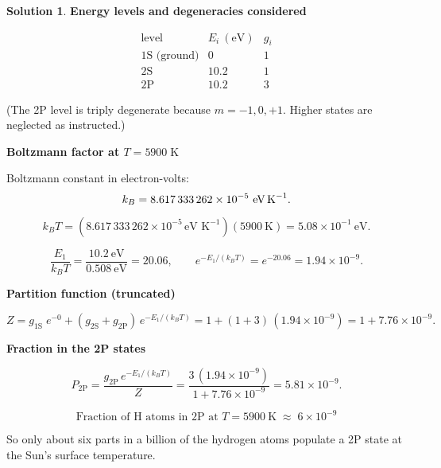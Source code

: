 \documentclass[12pt]{article}
\theoremstyle{definition} %
\newtheorem{solution}{Solution}
\theoremstyle{plain} %
\begin{document}
            \begin{solution}
              \textbf{Energy levels and degeneracies considered}
              
              \[
              \begin{array}{c|c|c}
              \text{level} & E_i\ (\text{eV}) & g_i \\ \hline
              \text{1S (ground)} & 0      & 1 \\
              \text{2S}          & 10.2   & 1 \\
              \text{2P}          & 10.2   & 3   %
              \end{array}
              \]
              
              (The 2P level is triply degenerate because \(m=-1,0,+1\).  
              Higher states are neglected as instructed.)
              
              \medskip
              \textbf{Boltzmann factor at \(T = 5900\;\text{K}\)}
              
              Boltzmann constant in electron-volts:
              \[
              k_B = 8.617\,333\,262\times10^{-5}\ \text{eV\,K}^{-1}.
              \]
              
              \[
              k_B T = (8.617\,333\,262\times10^{-5}\,\text{eV K}^{-1})(5900\ \text{K})
                     = 5.08\times10^{-1}\ \text{eV}.
              \]
              
              \[
              \frac{E_1}{k_B T} = \frac{10.2\ \text{eV}}{0.508\ \text{eV}} = 20.06,
              \qquad
              e^{-E_1/(k_B T)} = e^{-20.06} = 1.94\times10^{-9}.
              \]
              
              \medskip
              \textbf{Partition function (truncated)}
              
              \[
              Z = g_{1\text{S}}\;e^{-0}
                  + (g_{2\text{S}}+g_{2\text{P}})\,e^{-E_1/(k_B T)}
                = 1 + (1+3)\,(1.94\times10^{-9})
                = 1 + 7.76\times10^{-9}.
              \]
              
              \medskip
              \textbf{Fraction in the 2P states}
              
              \[
              P_{2\text{P}}
                = \frac{g_{2\text{P}}\,e^{-E_1/(k_B T)}}{Z}
                = \frac{3\,(1.94\times10^{-9})}{1 + 7.76\times10^{-9}}
                = 5.81\times10^{-9}.
              \]
              
              \[
              \boxed{\;
              \text{Fraction of H atoms in 2P at }T=5900\ \text{K}
                    \;\approx\; 6\times10^{-9}
              \;}
              \]
              
              So only about six parts in a billion of the hydrogen atoms populate a
              2P state at the Sun’s surface temperature.
              \end{solution}
\end{document}
